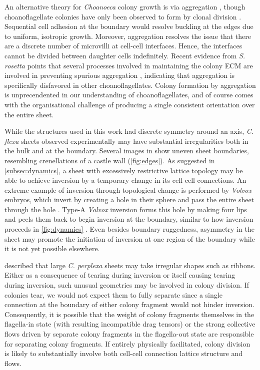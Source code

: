 An alternative theory for \textit{Choanoeca} colony growth is via aggregation \citep{grosberg2007}, though choanoflagellate colonies have only been observed to form by clonal division \citep{fairclough2010,alegado2012,woznica2016}.
Sequential cell adhesion at the boundary would resolve buckling at the edges due to uniform, isotropic growth.
Moreover, aggregation resolves the issue that there are a discrete number of microvilli at cell-cell interfaces.
Hence, the interfaces cannot be divided between daughter cells indefinitely.
Recent evidence from \textit{S. rosetta} points that several processes involved in maintaining the colony ECM are involved in preventing spurious aggregation \citep{wetzel2018}, indicating that aggregation is specifically disfavored in other choanoflagellates.
Colony formation by aggregation is unprecendented in our understanding of choanoflagellates, and of course comes with the organisational challenge of producing a single consistent orientation over the entire sheet.

While the structures used in this work had discrete symmetry around an axis, \textit{C. flexa} sheets observed experimentally may have substantial irregularities both in the bulk and at the boundary. 
Several images in \citet{brunet2019} show uneven sheet boundaries, resembling crenellations of a castle wall (\cref{fig:edges}).
As suggested in \cref{subsec:dynamics}, a sheet with excessively restrictive lattice topology may be able to achieve inversion by a temporary change in its cell-cell connections.
An extreme example of inversion through topological change is performed by \textit{Volvox} embryos, which invert by creating a hole in their sphere and pass the entire sheet through the hole \citep{hohn2015}.
Type-A \textit{Volvox} inversion forms this hole by making four lips and peels them back to begin inversion at the boundary, similar to how inversion proceeds in \cref{fig:dynamics} \citep{viamontes1977}.
Even besides boundary ruggedness, asymmetry in the sheet may promote the initiation of inversion at one region of the boundary while it is not yet possible elsewhere.

\citet{leadbeater1983} described that large \textit{C. perplexa} sheets may take irregular shapes such as ribbons. 
Either as a consequence of tearing during inversion or itself causing tearing during inversion, such unusual geometries may be involved in colony division.
If colonies tear, we would not expect them to fully separate since a single connection at the boundary of either colony fragment would not hinder inversion. 
Consequently, it is possible that the weight of colony fragments themselves in the flagella-in state (with resulting incompatible drag tensors) or the strong collective flows driven by separate colony fragments in the flagella-out state are responsible for separating colony fragments.
If entirely physically facilitated, colony division is likely to substantially involve both cell-cell connection lattice structure and flows.

